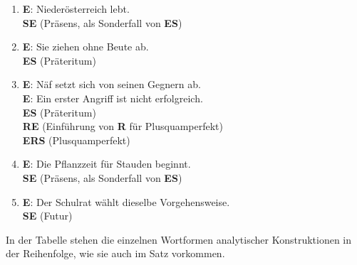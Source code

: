 \begin{enumerate}
  \item \textbf{E}: Niederösterreich lebt.\\
    \textbf{S\REq E} (Präsens, als Sonderfall von \textbf{E\RUn S})
  \item \textbf{E}: Sie ziehen ohne Beute ab.\\
    \textbf{E\RPr S} (Präteritum)
  \item \textbf{E}: Näf setzt sich von seinen Gegnern ab.\\
    \textbf{E}: Ein erster Angriff ist nicht erfolgreich.\\
    \textbf{E\RPr S} (Präteritum)\\
    \textbf{R\REq E} (Einführung von \textbf{R} für Plusquamperfekt)\\
    \textbf{E\RPr R\RPr S} (Plusquamperfekt)
  \item \textbf{E}: Die Pflanzzeit für Stauden beginnt.\\
    \textbf{S\RPr E} (Präsens, als Sonderfall von \textbf{E\RUn S})
  \item \textbf{E}: Der Schulrat wählt dieselbe Vorgehensweise.\\
    \textbf{S\RPr E} (Futur)
\end{enumerate}


In der Tabelle stehen die einzelnen Wortformen analytischer Konstruktionen in der Reihenfolge, wie sie auch im Satz vorkommen.

